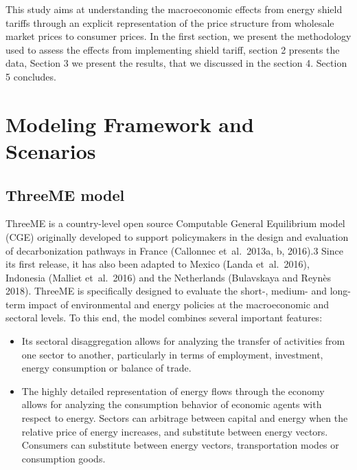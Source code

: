 \documentclass[
  letterpaper,
  DIV=11,
  numbers=noendperiod]{scrartcl}
\providecommand{\tightlist}{%
  \setlength{\itemsep}{0pt}\setlength{\parskip}{0pt}}\usepackage{longtable,booktabs,array}
\begin{document}
This study aims at understanding the macroeconomic effects from energy
shield tariffs through an explicit representation of the price structure
from wholesale market prices to consumer prices. In the first section,
we present the methodology used to assess the effects from implementing
shield tariff, section 2 presents the data, Section 3 we present the
results, that we discussed in the section 4. Section 5 concludes.

\hypertarget{modeling-framework-and-scenarios}{%
\section{Modeling Framework and
Scenarios}\label{modeling-framework-and-scenarios}}

\hypertarget{threeme-model}{%
\subsection{ThreeME model}\label{threeme-model}}

ThreeME is a country-level open source Computable General Equilibrium
model (CGE) originally developed to support policymakers in the design
and evaluation of decarbonization pathways in France (Callonnec
et~al.~2013a, b, 2016).3 Since its first release, it has also been
adapted to Mexico (Landa et~al.~2016), Indonesia (Malliet et~al.~2016)
and the Netherlands (Bulavskaya and Reynès 2018). ThreeME is
specifically designed to evaluate the short-, medium- and long-term
impact of environmental and energy policies at the macroeconomic and
sectoral levels. To this end, the model combines several important
features:

\begin{itemize}
\tightlist
\item
  Its sectoral disaggregation allows for analyzing the transfer of
  activities from one sector to another, particularly in terms of
  employment, investment, energy consumption or balance of trade.
\item
  The highly detailed representation of energy flows through the economy
  allows for analyzing the consumption behavior of economic agents with
  respect to energy. Sectors can arbitrage between capital and energy
  when the relative price of energy increases, and substitute between
  energy vectors. Consumers can substitute between energy vectors,
  transportation modes or consumption goods.
\end{itemize}
\end{document}
